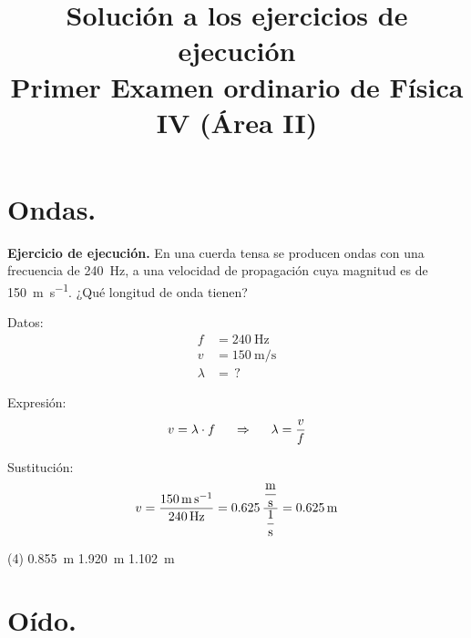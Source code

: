 \documentclass[12pt, letter]{exam}
\date{}
\title{Solución a los ejercicios de ejecución \\ Primer Examen ordinario de Física IV (Área II)}
\begin{document}
\maketitle

\setcounter{page}{2}

\begin{questions}

    \section{Ondas.}

    \setcounter{question}{3} \question \textbf{Ejercicio de ejecución.} En una cuerda tensa se producen ondas con una frecuencia de \SI{240}{\hertz}, a una velocidad de propagación cuya magnitud es de \SI{150}{\meter\per\second}. ¿Qué longitud de onda tienen?

    \begin{minipage}[t]{0.35\linewidth}
    Datos: 
    \begin{align*}
    f &= \SI{240}{\hertz} \\
    v &= \SI{150}{\meter\per\second} \\
    \lambda &= \, ?
    \end{align*}
    \end{minipage}
    \hspace{1cm}
    \begin{minipage}[t]{0.4\linewidth}
    Expresión:
    \begin{align*}
    v = \lambda \cdot f \hspace{0.5cm} \Rightarrow \hspace{0.5cm} \lambda = \dfrac{v}{f}
    \end{align*}
    \end{minipage}

    Sustitución:
    \begin{align*}
    v = \dfrac{\SI{150}{\meter\per\second}}{\SI{240}{\hertz}} = 0.625 \, \dfrac{ \displaystyle \unit[per-mode=fraction]{\meter\per\second}}{ \displaystyle \unit[per-mode=fraction]{\per\second}} = \SI{0.625}{\meter}
    \end{align*}
    \begin{tasks}(4)
       \task {}
       \task \SI{0.855}{\meter}
       \task \SI{1.920}{\meter}
       \task \SI{1.102}{\meter}
    \end{tasks}

    \setcounter{section}{2}

    \section{Oído.}


\end{questions}
\end{document}
